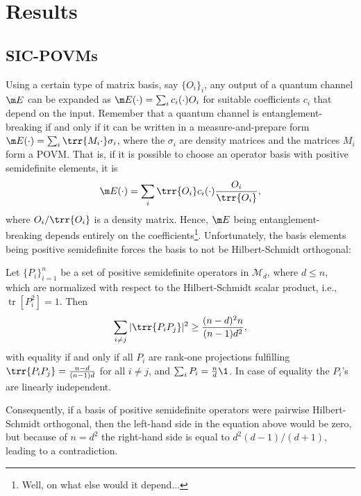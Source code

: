 \chapter{Results}\label{ch:own_results}
\section{SIC-POVMs}\label{sec:sic-povm}
Using a certain type of matrix basis, say $\{O_i\}_i$, any output of a quantum channel $\m E$ can be expanded as $\m E(\cdot) = \sum_i c_i(\cdot) O_i$ for suitable coefficients $c_i$ that depend on the input. Remember that a quantum channel is entanglement-breaking if and only if it can be written in a measure-and-prepare form $\m E (\cdot)= \sum_i \trr{M_i \cdot }\sigma_i$, where the $\sigma_i$ are density matrices and the matrices $M_i$ form a POVM. That is, if it is possible to choose an operator basis with positive semidefinite elements, it is
\begin{align}
    \m E (\cdot)=\sum_i \trr{O_i}c_i(\cdot) \frac{O_i}{\trr{O_i}},
\end{align}
where $O_i/\trr{O_i}$ is a density matrix. Hence, $\m E$ being entanglement-breaking depends entirely on the coefficients\footnote{Well, on what else would it depend...}. Unfortunately, the basis elements being positive semidefinite forces the basis to not be Hilbert-Schmidt orthogonal:
\begin{lemma}\label{lem:sic}
Let $\{P_i\}_{i=1}^n$ be a set of positive semidefinite operators in $\mathcal{M}_d$, where $d \leq n$, which are normalized with respect to the Hilbert-Schmidt scalar product, i.e., $\operatorname{tr}[P_i^2] = 1$. Then
\begin{align*}
    \sum_{i \neq j} |\trr{P_iP_j}|^2 \geq \frac{(n-d)^2 n}{(n-1)d^2}, 
\end{align*}
with equality if and only if all $P_i$ are rank-one projections fulfilling $\trr{P_i P_j} = \frac{n-d}{(n-1)d}$ for all $i \neq j$, and $\sum_i P_i = \frac{n}{d}\1$. In case of equality the $P_i$'s are linearly independent.
\end{lemma}

Consequently, if a basis of positive semidefinite operators were pairwise Hilbert-Schmidt orthogonal, then the left-hand side in the equation above would be zero, but because of $n=d^2$ the right-hand side is equal to $d^2(d-1)/(d+1)$, leading to a contradiction. 

